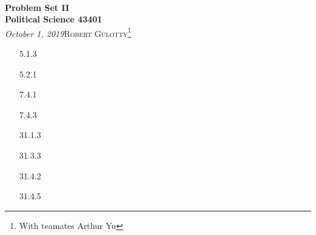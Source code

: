 \documentclass[12pt]{article}
\begin{document}
{\noindent\Huge\bf  \\[0.5\baselineskip] {\selectfont  Problem Set II}         }\\[2\baselineskip] %
{ {\bf {}\selectfont Political Science 43401}\\ {\textit{\selectfont     October 1, 2019}}}\hfill   {\large \textsc{Robert Gulotty}\footnote{With teamates Arthur Yu}} %
\\[1.4\baselineskip] 





\begin{enumerate}

\item[5.1.3] 
\item[5.2.1]
\item[7.4.1]
\item[7.4.3]

\item[31.1.3]
\item[31.3.3]
\item[31.4.2 ]
\item[31.4.5 ] 

\end{enumerate}
\end{document}
